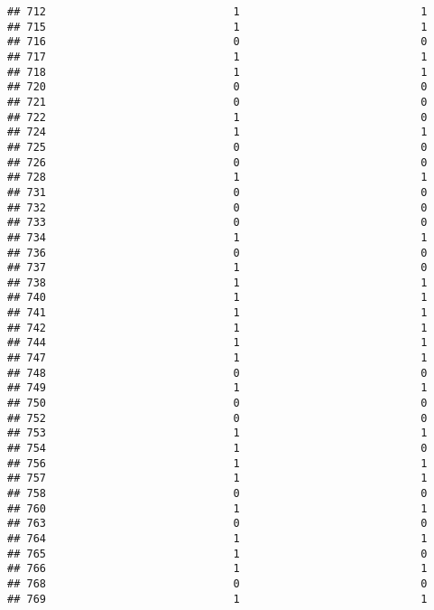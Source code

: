 \documentclass[
]{article}
\begin{document}
\begin{verbatim}
## 712                             1                            1
## 715                             1                            1
## 716                             0                            0
## 717                             1                            1
## 718                             1                            1
## 720                             0                            0
## 721                             0                            0
## 722                             1                            0
## 724                             1                            1
## 725                             0                            0
## 726                             0                            0
## 728                             1                            1
## 731                             0                            0
## 732                             0                            0
## 733                             0                            0
## 734                             1                            1
## 736                             0                            0
## 737                             1                            0
## 738                             1                            1
## 740                             1                            1
## 741                             1                            1
## 742                             1                            1
## 744                             1                            1
## 747                             1                            1
## 748                             0                            0
## 749                             1                            1
## 750                             0                            0
## 752                             0                            0
## 753                             1                            1
## 754                             1                            0
## 756                             1                            1
## 757                             1                            1
## 758                             0                            0
## 760                             1                            1
## 763                             0                            0
## 764                             1                            1
## 765                             1                            0
## 766                             1                            1
## 768                             0                            0
## 769                             1                            1

\end{verbatim}
\end{document}
